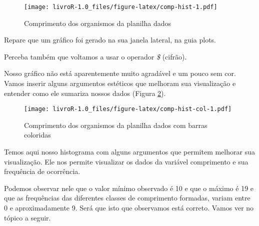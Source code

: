 \documentclass[]{book}
\newenvironment{Shaded}{\begin{snugshade}}{\end{snugshade}}
\newcommand{\DataTypeTok}[1]{\textcolor[rgb]{0.13,0.29,0.53}{#1}}
\newcommand{\DecValTok}[1]{\textcolor[rgb]{0.00,0.00,0.81}{#1}}
\newcommand{\KeywordTok}[1]{\textcolor[rgb]{0.13,0.29,0.53}{\textbf{#1}}}
\newcommand{\NormalTok}[1]{#1}
\newcommand{\OperatorTok}[1]{\textcolor[rgb]{0.81,0.36,0.00}{\textbf{#1}}}
\newcommand{\StringTok}[1]{\textcolor[rgb]{0.31,0.60,0.02}{#1}}
\begin{document}
\begin{Shaded}
\end{Shaded}

\begin{figure}
\centering
\texttt{[image: livroR-1.0\_files/figure-latex/comp-hist-1.pdf]}
\caption{\label{fig:comp-hist}Comprimento dos organismos da planilha dados}
\end{figure}

Repare que um gráfico foi gerado na sua janela lateral, na guia plots.

Perceba também que voltamos a usar o operador \emph{\$} (cifrão).

Nosso gráfico não está aparentemente muito agradável e um pouco sem cor. Vamos inserir alguns argumentos estéticos que melhoram sua visualização e entender como ele sumariza nossos dados (Figura \ref{fig:comp-hist-col}).

\begin{Shaded}
\end{Shaded}

\begin{figure}
\centering
\texttt{[image: livroR-1.0\_files/figure-latex/comp-hist-col-1.pdf]}
\caption{\label{fig:comp-hist-col}Comprimento dos organismos da planilha dados com barras coloridas}
\end{figure}

Temos aqui nosso histograma com alguns argumentos que permitem melhorar sua visualização. Ele nos permite visualizar os dados da variável comprimento e sua frequência de ocorrência.

Podemos observar nele que o valor mínimo observado é 10 e que o máximo é 19 e que as frequências das diferentes classes de comprimento formadas, variam entre 0 e aproximadamente 9. Será que isto que observamos está correto. Vamos ver no tópico a seguir.
\end{document}
